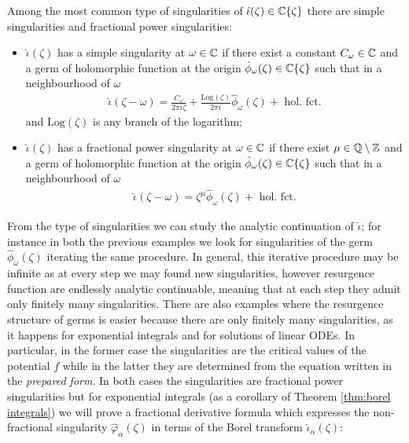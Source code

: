 \documentclass[11pt,a4paper,twoside,leqno,noamsfonts]{amsart}
\numberwithin{equation}{section}
\begin{document}
Among the most common type of singularities of $\hat{\iota}(\zeta)\in\mathbb C\lbrace\zeta\rbrace$ there are simple singularities and fractional power singularities: 
\begin{itemize}
\item $\hat{\iota}(\zeta)$ has a simple singularity at $\omega\in\mathbb C$ if there exist a constant $C_\omega\in\mathbb C$ and a germ of holomorphic function at the origin $\hat{\phi}_\omega(\zeta)\in\mathbb C\lbrace\zeta\rbrace$ such that in a neighbourhood of $\omega$
\begin{align*}
\hat{\iota}(\zeta-\omega)=\frac{C_\omega}{2\pi i \zeta}+\frac{\mathrm{Log}(\zeta)}{2\pi i}\hat{\phi}_{\omega}(\zeta)+\text{ hol. fct.}
\end{align*} 
and $\mathrm{Log}(\zeta)$ is any branch of the logarithm;
\item $\hat{\iota}(\zeta)$ has a fractional power singularity at $\omega\in\mathbb C$ if there exist $\mu\in\mathbb Q\setminus\mathbb Z$ and a germ of holomorphic function at the origin $\hat{\phi}_\omega(\zeta)\in\mathbb C\lbrace\zeta\rbrace$ such that in a neighbourhood of $\omega$
\begin{align*}
\hat{\iota}(\zeta-\omega)=\zeta^{\mu}\hat{\phi}_\omega(\zeta)+ \text{ hol. fct.}
\end{align*}
\end{itemize} 

From the type of singularities we can study the analytic continuation of $\hat{\iota}$; for instance in both the previous examples we look for singularities of the germ $\hat{\phi}_\omega(\zeta)$ iterating the same procedure. In general, this iterative procedure may be infinite as at every step we may found new singularities, however resurgence function are endlessly analytic continuable, meaning that at each step they admit only finitely many singularities. There are also examples where the resurgence structure of germs is easier because there are only finitely many singularities, as it happens for exponential integrals and for solutions of linear ODEs. In particular, in the former case the singularities are the critical values of the potential $f$ while in the latter they are determined from the equation written in the \textit{prepared form}. In both cases the singularities are fractional power singularities but for exponential integrals (as a corollary of Theorem \ref{thm:borel integrals}) we will prove a fractional derivative formula which expresses the non-fractional singularity $\hat{\varphi}_\alpha(\zeta)$ in terms of the Borel transform  $\hat{\iota}_\alpha(\zeta)$:
\end{document}
